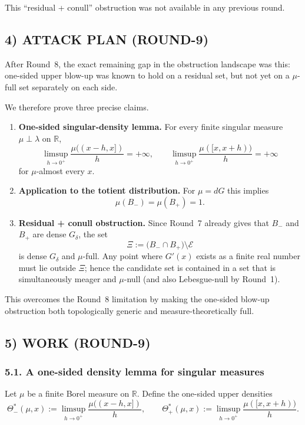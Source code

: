 This ``residual + conull'' obstruction was not available in any previous round.

\subsection{4) ATTACK PLAN (ROUND-9)}

After Round~8, the exact remaining gap in the obstruction landscape was this:
one-sided upper blow-up was known to hold on a residual set, but not yet on a $\mu$-full set separately on each side.

We therefore prove three precise claims.

\begin{enumerate}
\item \textbf{One-sided singular-density lemma.}
For every finite singular measure $\mu\perp\lambda$ on $\mathbb R$,
\[
\limsup_{h\to0^+}\frac{\mu((x-h,x])}{h}=+\infty,
\qquad
\limsup_{h\to0^+}\frac{\mu([x,x+h))}{h}=+\infty
\]
for $\mu$-almost every $x$.

\item \textbf{Application to the totient distribution.}
For $\mu=dG$ this implies
\[
\mu(B_-)=\mu(B_+)=1.
\]

\item \textbf{Residual + conull obstruction.}
Since Round~7 already gives that $B_-$ and $B_+$ are dense $G_\delta$, the set
\[
\Xi:=\bigl(B_-\cap B_+\bigr)\setminus\mathcal E
\]
is dense $G_\delta$ and $\mu$-full. Any point where $G'(x)$ exists as a finite real number must lie outside $\Xi$; hence the candidate set is contained in a set that is simultaneously meager and $\mu$-null (and also Lebesgue-null by Round~1).
\end{enumerate}

This overcomes the Round~8 limitation by making the one-sided blow-up obstruction both topologically generic and measure-theoretically full.

\subsection{5) WORK (ROUND-9)}

\subsubsection*{5.1. A one-sided density lemma for singular measures}

Let $\mu$ be a finite Borel measure on $\mathbb R$. Define the one-sided upper densities
\[
\Theta_-^*(\mu,x):=\limsup_{h\to0^+}\frac{\mu((x-h,x])}{h},
\qquad
\Theta_+^*(\mu,x):=\limsup_{h\to0^+}\frac{\mu([x,x+h))}{h}.
\]

